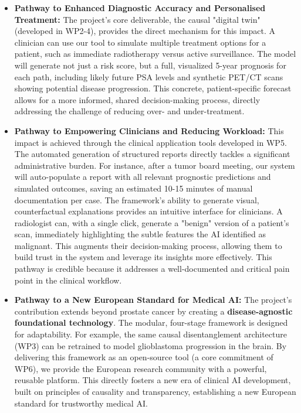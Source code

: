\documentclass[11pt, a4paper]{article}
\begin{document}
\begin{itemize}
    \item \textbf{Pathway to Enhanced Diagnostic Accuracy and Personalised Treatment:} The project's core deliverable, the causal "digital twin" (developed in WP2-4), provides the direct mechanism for this impact. A clinician can use our tool to simulate multiple treatment options for a patient, such as immediate radiotherapy versus active surveillance. The model will generate not just a risk score, but a full, visualized 5-year prognosis for each path, including likely future PSA levels and synthetic PET/CT scans showing potential disease progression. This concrete, patient-specific forecast allows for a more informed, shared decision-making process, directly addressing the challenge of reducing over- and under-treatment.

    \item \textbf{Pathway to Empowering Clinicians and Reducing Workload:} This impact is achieved through the clinical application tools developed in WP5. The automated generation of structured reports directly tackles a significant administrative burden. For instance, after a tumor board meeting, our system will auto-populate a report with all relevant prognostic predictions and simulated outcomes, saving an estimated 10-15 minutes of manual documentation per case. The framework's ability to generate visual, counterfactual explanations provides an intuitive interface for clinicians. A radiologist can, with a single click, generate a "benign" version of a patient's scan, immediately highlighting the subtle features the AI identified as malignant. This augments their decision-making process, allowing them to build trust in the system and leverage its insights more effectively. This pathway is credible because it addresses a well-documented and critical pain point in the clinical workflow.

    \item \textbf{Pathway to a New European Standard for Medical AI:} The project's contribution extends beyond prostate cancer by creating a \textbf{disease-agnostic foundational technology}. The modular, four-stage framework is designed for adaptability. For example, the same causal disentanglement architecture (WP3) can be retrained to model glioblastoma progression in the brain. By delivering this framework as an open-source tool (a core commitment of WP6), we provide the European research community with a powerful, reusable platform. This directly fosters a new era of clinical AI development, built on principles of causality and transparency, establishing a new European standard for trustworthy medical AI.
\end{itemize}
\end{document}
